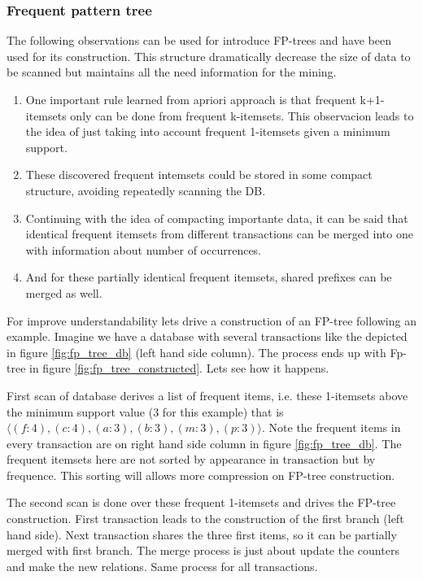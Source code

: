 \subsubsection{Frequent pattern tree}

The following observations can be used for introduce FP-trees and have been used
for its construction. This structure dramatically decrease the size of data to be 
scanned but maintains all the need information for the mining.

\begin{enumerate}[label=\roman*)]
  \item One important rule learned from apriori approach is that frequent
    k+1-itemsets only can be done from frequent k-itemsets. This observacion
    leads to the idea of just taking into account frequent 1-itemsets given a
    minimum support.
  \item These discovered frequent intemsets could be stored in some compact
    structure, avoiding repeatedly scanning the DB.
  \item Continuing with the idea of compacting importante data, it can be said
    that identical frequent itemsets from different transactions can be merged
    into one with information about number of occurrences.
  \item And for these partially identical frequent itemsets, shared prefixes can
    be merged as well.
\end{enumerate}

For improve understandability lets drive a construction of an FP-tree following an
example. Imagine we have a database with several transactions like the depicted
in figure \ref{fig:fp_tree_db} (left hand side column). The process ends up with
Fp-tree in figure \ref{fig:fp_tree_constructed}. Lets see how it happens. 

First scan of database derives a list of frequent items, i.e. these 1-itemsets 
above the minimum support value (3 for this example) that is $\langle
(f:4),(c:4),(a:3),(b:3),(m:3),(p:3) \rangle$. Note the frequent items in every
transaction are on right hand side column in figure \ref{fig:fp_tree_db}. The
frequent itemsets here are not sorted by appearance in transaction but by
frequence. This sorting will allows more compression on FP-tree construction.

The second scan is done over these frequent 1-itemsets and drives the
FP-tree construction. First transaction leads to the construction of the first
branch (left hand side). Next transaction shares the three first items, so
it can be partially merged with first branch. The merge process is just about
update the counters and make the new relations. Same process for all
transactions.

